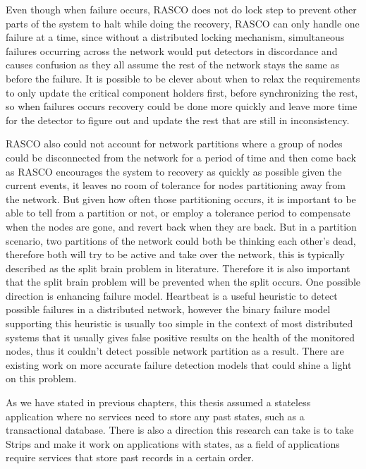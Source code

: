 Even though when failure occurs, RASCO does not do lock step to prevent other parts of the system to halt while doing the recovery, RASCO can only handle one failure at a time, since without a distributed locking mechanism, simultaneous failures occurring across the network would put detectors in discordance and causes confusion as they all assume the rest of the network stays the same as before the failure. It is possible to be clever about when to relax the requirements to only update the critical component holders first, before synchronizing the rest, so when failures occurs recovery could be done more quickly and leave more time for the detector to figure out and update the rest that are still in inconsistency. 

RASCO also could not account for network partitions where a group of nodes could be disconnected from the network for a period of time and then come back as RASCO encourages the system to recovery as quickly as possible given the current events, it leaves no room of tolerance for nodes partitioning away from the network. But given how often those partitioning occurs, it is important to be able to tell from a partition or not, or employ a tolerance period to compensate when the nodes are gone, and revert back when they are back. But in a partition scenario, two partitions of the network could both be thinking each other's dead, therefore both will try to be active and take over the network, this is typically described as the split brain problem in literature. Therefore it is also important that the split brain problem will be prevented when the split occurs. One possible direction is enhancing failure model. Heartbeat is a useful heuristic to detect possible failures in a distributed network, however the binary failure model supporting this heuristic is usually too simple in the context of most distributed systems that it usually gives false positive results on the health of the monitored nodes, thus it couldn't detect possible network partition as a result. There are existing work on more accurate failure detection models that could shine a light on this problem.

As we have stated in previous chapters, this thesis assumed a stateless application where no services need to store any past states, such as a transactional database. There is also a direction this research can take is to take Strips and make it work on applications with states, as a field of applications require services that store past records in a certain order.

